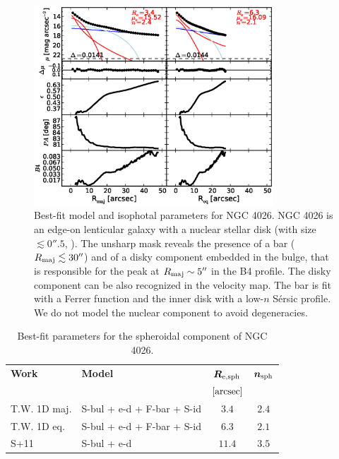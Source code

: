 \documentclass[preprint2]{emulateapj}
\newcommand{\fitfigurewidth}{0.8\textwidth}
\begin{document}
  \begin{figure}[h]
  \begin{center}
  \includegraphics[width=\fitfigurewidth]{images/n4026_1Dfit.eps}
  \caption{Best-fit model and isophotal parameters for NGC 4026.
  NGC 4026 is an edge-on lenticular galaxy with a nuclear stellar disk (with size $\lesssim 0''.5$, \citealt{ledo2010}).
  The unsharp mask reveals the presence of a bar ($R_{\rm maj} \lesssim 30''$) and of a disky component 
  embedded in the bulge, that is responsible for the peak at $R_{\rm maj} \sim 5''$ in the B4 profile.
  The disky component can be also recognized in the velocity map.
  The bar is fit with a Ferrer function and the inner disk with a low-$n$ S\'ersic profile.
  We do not model the nuclear component to avoid degeneracies.
  }
  \end{center}
  \end{figure}

  \begin{table}[h]
  \small
  \caption{Best-fit parameters for the spheroidal component of NGC 4026.}
  \begin{center}
  \begin{tabular}{llcc}
  \hline
  {\bf Work} & {\bf Model}   & $\bm R_{\rm e,sph}$    & $\bm n_{\rm sph}$ \\
    &  &  $[\rm arcsec]$ & \\
  \hline
  T.W. 1D maj. & S-bul + e-d + F-bar + S-id & $3.4$  &  $2.4$ \\
  T.W. 1D eq.  & S-bul + e-d + F-bar + S-id & $6.3$  &  $2.1$ \\
  \hline
  S+11         & S-bul + e-d & $11.4$  &  $3.5$ \\
  \hline
  \end{tabular}
  \end{center}
  \label{tab:n4026}
  \end{table}
\end{document}
